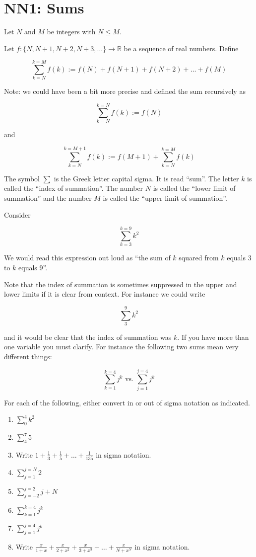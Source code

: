\section{NN1: Sums}

\begin{definition}
	Let $N$ and $M$ be integers with $N \leq M$.
	
	Let $f:  \{N, N+1, N+2, N+3, \dots\}\to \mathbb{R}$ be a sequence of real numbers.  Define 
	
	\[
\sum_{k=N}^{k=M} f(k) := f(N) + f(N+1) + f(N+2) + \dots + f(M)
\]

\end{definition}

Note:  we could have been a bit more precise and defined the sum recursively as 

\[
\sum_{k=N}^{k=N} f(k) := f(N)
\]

and

\[
\sum_{k=N}^{k=M+1} f(k) := f(M+1) + \sum_{k=N}^{k=M} f(k)
\]

The symbol $\sum$ is the Greek letter capital sigma.  It is read ``sum''.  The letter $k$ is called the ``index of summation''.  The number $N$ is called the ``lower limit of summation'' and the number $M$ is called the ``upper limit of summation''.

Consider
 
\[
\sum_{k=3}^{k=9} k^2 
\]

We would read this expression out loud as ``the sum of $k$ squared from $k$ equals $3$ to $k$ equals $9$''.  

Note that the index of summation is sometimes suppressed in the upper and lower limits if it is clear from context.  For instance we could write

\[
\sum_{3}^{9} k^2 
\]

and it would be clear that the index of summation was $k$.  If you have more than one variable you must clarify.  For instance the following two sums mean very different things:

\[
\sum_{k=1}^{k=4} j^k \textrm{ vs. } \sum_{j=1}^{j=4} j^k
\]


\begin{example}
	For each of the following, either convert in or out of sigma notation as indicated.  

	\begin{enumerate}
			\item $\displaystyle\sum_0^4 k^2$
			\item $\displaystyle\sum_4^7 5$
			\item Write $1 + \frac{1}{3} + \frac{1}{5} + \dots + \frac{1}{135}$ in sigma notation.
			\item $\displaystyle\sum_{j=1}^{j=N} 2$
			\item $\displaystyle\sum_{j=-2}^{j=2} j+N$
			\item $\displaystyle\sum_{k=1}^{k=4} j^k $
			\item $\displaystyle\sum_{j=1}^{j=4} j^k$
			\item Write $\frac{x}{1+x} + \frac{x}{2+x^2} + \frac{x}{3 + x^3} + \dots + \frac{x}{N + x^N} $ in sigma notation.
		\end{enumerate}
	\end{example}

